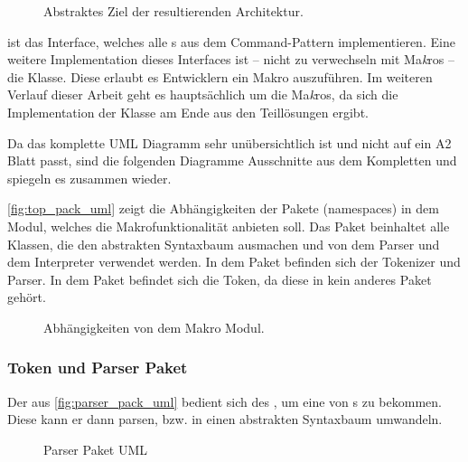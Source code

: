     \begin{figure}[H]
      \centering
      \caption{Abstraktes Ziel der resultierenden Architektur.}
      \label{fig:abstract_goal_uml}
    \end{figure}
     ist das Interface, welches alle s aus dem Command-Pattern implementieren. %
    Eine weitere Implementation dieses Interfaces ist --
    nicht zu verwechseln mit Ma\emph{k}ros -- die  Klasse. %
    Diese erlaubt es Entwicklern ein Makro auszuführen. Im weiteren Verlauf dieser Arbeit geht es hauptsächlich um die Ma\emph{k}ros, da sich die Implementation der  Klasse am Ende aus den Teillösungen ergibt.

    Da das komplette UML Diagramm sehr unübersichtlich ist und nicht auf ein A2 Blatt passt, sind die folgenden Diagramme Ausschnitte aus dem Kompletten und spiegeln es zusammen wieder.

    \autoref{fig:top_pack_uml} zeigt die Abhängigkeiten der Pakete (namespaces) in dem Modul, welches die Makrofunktionalität anbieten soll. Das  Paket beinhaltet alle Klassen, die den abstrakten Syntaxbaum ausmachen und von dem Parser und dem Interpreter verwendet werden. In dem  Paket befinden sich der Tokenizer und Parser. In dem  Paket befindet sich die Token, da diese in kein anderes Paket gehört.
    \begin{figure}[H]
      \centering
      \caption{Abhängigkeiten von dem Makro Modul.}
      \label{fig:top_pack_uml}
    \end{figure}

    \subsubsection{Token und Parser Paket} %
    \label{sssec:Token und Parser Paket}
      Der  aus \autoref{fig:parser_pack_uml} bedient sich des , um eine  von s zu bekommen. Diese  kann er dann parsen, bzw. in einen abstrakten Syntaxbaum umwandeln.
      \begin{figure}[H]
        \centering
        \caption{Parser Paket UML}
        \label{fig:parser_pack_uml}
      \end{figure}

